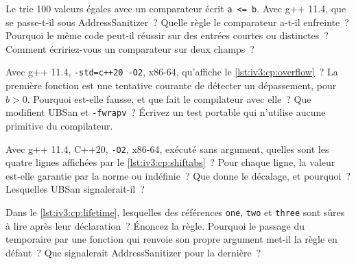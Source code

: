 \begin{question}\label{iq:iv3:cpp:30}
Le  trie 100 valeurs égales avec un comparateur écrit \texttt{a <= b}. Avec g++ 11.4, que se passe-t-il sous AddressSanitizer~? Quelle règle le comparateur a-t-il enfreinte~? Pourquoi le même code peut-il réussir sur des entrées courtes ou distinctes~? Comment écririez-vous un comparateur sur deux champs~?
\label{lst:iv3:cp:sortle}
\end{question}

\begin{question}\label{iq:iv3:cpp:31}
Avec g++ 11.4, \texttt{-std=c++20 -O2}, x86-64, qu'affiche le \cref{lst:iv3:cp:overflow}~? La première fonction est une tentative courante de détecter un dépassement, pour $b > 0$. Pourquoi est-elle fausse, et que fait le compilateur avec elle~? Que modifient UBSan et \texttt{-fwrapv}~? Écrivez un test portable qui n'utilise aucune primitive du compilateur.
\label{lst:iv3:cp:overflow}
\end{question}

\begin{question}\label{iq:iv3:cpp:32}
Avec g++ 11.4, C++20, \texttt{-O2}, x86-64, exécuté sans argument, quelles sont les quatre lignes affichées par le \cref{lst:iv3:cp:shiftabs}~? Pour chaque ligne, la valeur est-elle garantie par la norme ou indéfinie~? Que donne le décalage, et pourquoi~? Lesquelles UBSan signalerait-il~?
\label{lst:iv3:cp:shiftabs}
\end{question}

\begin{question}\label{iq:iv3:cpp:33}
Dans le \cref{lst:iv3:cp:lifetime}, lesquelles des références \texttt{one}, \texttt{two} et \texttt{three} sont sûres à lire après leur déclaration~? Énoncez la règle. Pourquoi le passage du temporaire par une fonction qui renvoie son propre argument met-il la règle en défaut~? Que signalerait AddressSanitizer pour la dernière~?
\label{lst:iv3:cp:lifetime}
\end{question}

